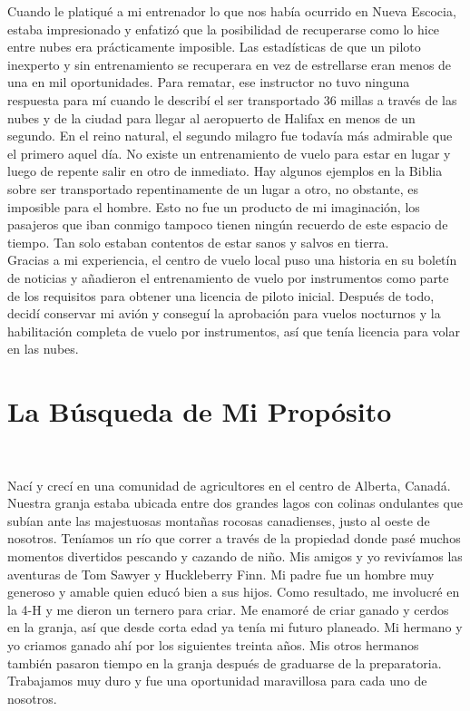 \documentclass[twoside, 12pt]{book}
\begin{document}
Cuando le platiqué a mi entrenador lo que nos había ocurrido en Nueva Escocia, estaba impresionado y enfatizó que la posibilidad de recuperarse como lo hice entre nubes era prácticamente imposible. Las estadísticas de que un piloto inexperto y sin entrenamiento se recuperara en vez de estrellarse eran menos de una en mil oportunidades. Para rematar, ese instructor no tuvo ninguna respuesta para mí cuando le describí el ser transportado 36 millas a través de las nubes y de la ciudad para llegar al aeropuerto de Halifax en menos de un segundo. En el reino natural, el segundo milagro fue todavía más admirable que el primero aquel día. No existe un entrenamiento de vuelo para estar en lugar y luego de repente salir en otro de inmediato. Hay algunos ejemplos en la Biblia sobre ser transportado repentinamente de un lugar a otro, no obstante, es imposible para el hombre. Esto no fue un producto de mi imaginación, los pasajeros que iban conmigo tampoco tienen ningún recuerdo de este espacio de tiempo. Tan solo estaban contentos de estar sanos y salvos en tierra.\\

Gracias a mi experiencia, el centro de vuelo local puso una historia en su boletín de noticias y añadieron el entrenamiento de vuelo por instrumentos como parte de los requisitos para obtener una licencia de piloto inicial. Después de todo, decidí conservar mi avión y conseguí la aprobación para vuelos nocturnos y la habilitación completa de vuelo por instrumentos, así que tenía licencia para volar en las nubes.\\

\chapter{La Búsqueda de Mi Propósito }
\

Nací y crecí en una comunidad de agricultores en el centro de Alberta, Canadá. Nuestra granja estaba ubicada entre dos grandes lagos con colinas ondulantes que subían ante las majestuosas montañas rocosas canadienses, justo al oeste de nosotros. Teníamos un río que correr a través de la propiedad donde pasé muchos momentos divertidos pescando y cazando de niño. Mis amigos y yo revivíamos las aventuras de Tom Sawyer y Huckleberry Finn. Mi padre fue un hombre muy generoso y amable quien educó bien a sus hijos. Como resultado, me involucré en la 4-H y me dieron un ternero para criar. Me enamoré de criar ganado y cerdos en la granja, así que desde corta edad ya tenía mi futuro planeado. Mi hermano y yo criamos ganado ahí por los siguientes treinta años. Mis otros hermanos también pasaron tiempo en la granja después de graduarse de la preparatoria. Trabajamos muy duro y fue una oportunidad maravillosa para cada uno de nosotros.\\
\end{document}
